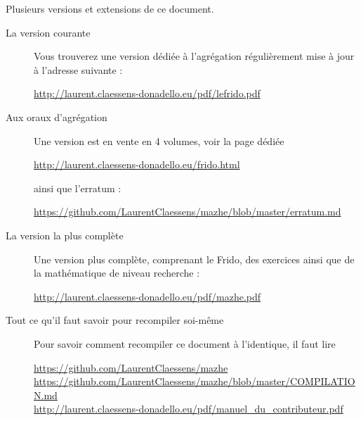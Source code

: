 
\thispagestyle{empty}

Plusieurs versions et extensions de ce document.
\begin{description}

    \item[La version courante]

        Vous trouverez une version dédiée à l'agrégation régulièrement mise à jour à l'adresse suivante :
        \begin{center}
            \url{http://laurent.claessens-donadello.eu/pdf/lefrido.pdf}
        \end{center}

    \item[Aux oraux d'agrégation]

        Une version est en vente en 4 volumes, voir la page dédiée
        \begin{center}
            \url{http://laurent.claessens-donadello.eu/frido.html}
        \end{center}
        ainsi que l'erratum :
        \begin{center}
            \url{https://github.com/LaurentClaessens/mazhe/blob/master/erratum.md}
        \end{center}

    \item[La version la plus complète]

        Une version plus complète, comprenant le Frido, des exercices ainsi que de la mathématique de niveau recherche :
        \begin{center}
        \url{http://laurent.claessens-donadello.eu/pdf/mazhe.pdf}
        \end{center}

    \item[Tout ce qu'il faut savoir pour recompiler soi-même]
        Pour savoir comment recompiler ce document à l'identique, il faut lire
        \begin{center}
            \url{https://github.com/LaurentClaessens/mazhe}\\
            \url{https://github.com/LaurentClaessens/mazhe/blob/master/COMPILATION.md}\\
            \url{http://laurent.claessens-donadello.eu/pdf/manuel_du_contributeur.pdf}
        \end{center}

\end{description}
